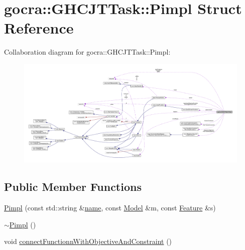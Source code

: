 \hypertarget{structgocra_1_1GHCJTTask_1_1Pimpl}{}\section{gocra\+:\+:G\+H\+C\+J\+T\+Task\+:\+:Pimpl Struct Reference}
\label{structgocra_1_1GHCJTTask_1_1Pimpl}


Collaboration diagram for gocra\+:\+:G\+H\+C\+J\+T\+Task\+:\+:Pimpl\+:
\nopagebreak
\begin{figure}[H]
\begin{center}
\leavevmode
\includegraphics[width=350pt]{d8/daf/structgocra_1_1GHCJTTask_1_1Pimpl__coll__graph}
\end{center}
\end{figure}
\subsection*{Public Member Functions}
\begin{DoxyCompactItemize}
\item 
\hyperlink{structgocra_1_1GHCJTTask_1_1Pimpl_ad413aad5c0e13b459b10d16dc91c8579}{Pimpl} (const std\+::string \&\hyperlink{structgocra_1_1GHCJTTask_1_1Pimpl_a62bf1c09164be6cf8a48360bd6e53d64}{name}, const \hyperlink{classocra_1_1Model}{Model} \&m, const \hyperlink{classocra_1_1Feature}{Feature} \&s)
\item 
\hyperlink{structgocra_1_1GHCJTTask_1_1Pimpl_a40a8c393004df9cb06d2cacf7a60b55f}{$\sim$\+Pimpl} ()
\item 
void \hyperlink{structgocra_1_1GHCJTTask_1_1Pimpl_aeedb4e2ac7e5dc4b68655b124ee8ed58}{connect\+Functionn\+With\+Objective\+And\+Constraint} ()
\end{DoxyCompactItemize}
